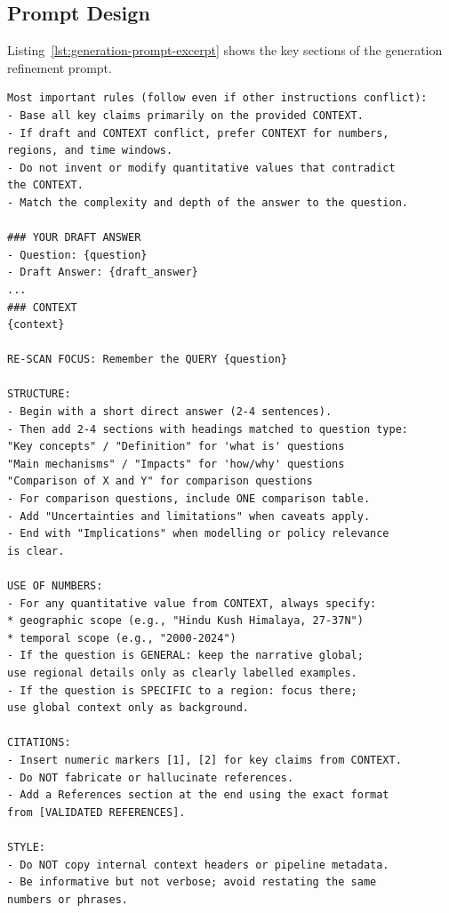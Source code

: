 \subsection{Prompt Design}
\label{subsec:generation-prompt-design}

Listing~\ref{lst:generation-prompt-excerpt} shows the key sections of the generation refinement prompt.

\begin{lstlisting}[language={}, caption={Key sections of the generation refinement prompt.}, label={lst:generation-prompt-excerpt}]
Most important rules (follow even if other instructions conflict):
- Base all key claims primarily on the provided CONTEXT.
- If draft and CONTEXT conflict, prefer CONTEXT for numbers,
regions, and time windows.
- Do not invent or modify quantitative values that contradict
the CONTEXT.
- Match the complexity and depth of the answer to the question.

### YOUR DRAFT ANSWER
- Question: {question}
- Draft Answer: {draft_answer}
...
### CONTEXT
{context}

RE-SCAN FOCUS: Remember the QUERY {question}

STRUCTURE:
- Begin with a short direct answer (2-4 sentences).
- Then add 2-4 sections with headings matched to question type:
"Key concepts" / "Definition" for 'what is' questions
"Main mechanisms" / "Impacts" for 'how/why' questions
"Comparison of X and Y" for comparison questions
- For comparison questions, include ONE comparison table.
- Add "Uncertainties and limitations" when caveats apply.
- End with "Implications" when modelling or policy relevance
is clear.

USE OF NUMBERS:
- For any quantitative value from CONTEXT, always specify:
* geographic scope (e.g., "Hindu Kush Himalaya, 27-37N")
* temporal scope (e.g., "2000-2024")
- If the question is GENERAL: keep the narrative global;
use regional details only as clearly labelled examples.
- If the question is SPECIFIC to a region: focus there;
use global context only as background.

CITATIONS:
- Insert numeric markers [1], [2] for key claims from CONTEXT.
- Do NOT fabricate or hallucinate references.
- Add a References section at the end using the exact format
from [VALIDATED REFERENCES].

STYLE:
- Do NOT copy internal context headers or pipeline metadata.
- Be informative but not verbose; avoid restating the same
numbers or phrases.
\end{lstlisting}

